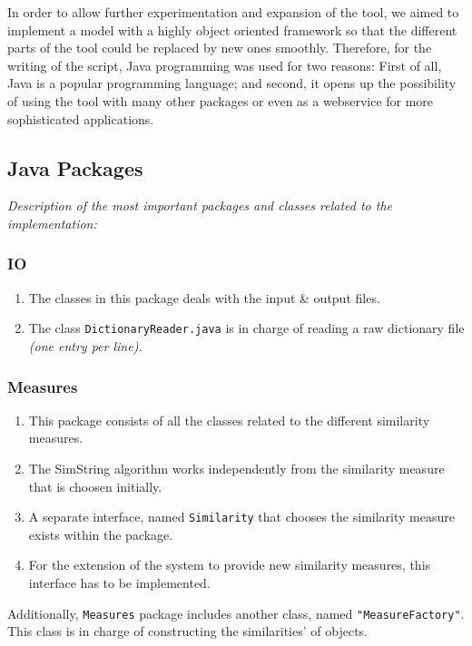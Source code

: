 In order to allow further experimentation and expansion of the tool, we aimed to implement a model with a highly object oriented framework so that the different parts of the tool could be replaced by new ones smoothly. Therefore, for the writing of the script, Java programming was used for two reasons: First of all, Java is a popular programming language; and second, it opens up the possibility of using the tool with many other packages or even as a webservice for more sophisticated applications.
\subsection{Java Packages}
\emph{Description of the most important  packages and classes related to the implementation:}
\subsubsection*{IO}
\begin{enumerate}[-]
	\item The classes in this package deals with the input \& output files.
	\item The class \texttt{DictionaryReader.java} is in charge of reading a raw dictionary file \textit{(one entry per line).}
\end{enumerate}

\subsubsection*{Measures}
\begin{enumerate}[-]
	\item This package consists of all the classes related to the different similarity measures.
	\item The SimString algorithm works independently from the similarity measure that is choosen initially.
	\item A separate interface, named \texttt{Similarity} that chooses the similarity measure exists within the package.
	\item For the extension of the system to provide new similarity measures, this interface has to be implemented.
\end{enumerate}
Additionally, \texttt{Measures} package includes another class, named \texttt{"MeasureFactory"}. This class is in charge of constructing the similarities' of objects.

